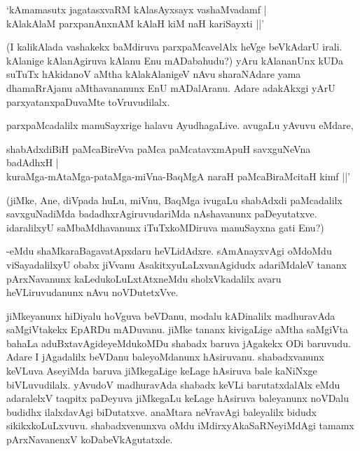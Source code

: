 \begin{shloka}
`kAmamasutx jagatasxvaRM kAlasAyxsayx vashaMvadamf |\\
kAlakAlaM parxpanAnxnAM kAlaH kiM naH kariSayxti ||'
\end{shloka}

(I kalikAlada vashakekx baMdiruva parxpaMcavelAlx heVge beVkAdarU irali. kAlanige kAlanAgiruva kAlanu Enu mADabahudu?) yAru kAlananUnx kUDa suTuTx hAkidanoV aMtha kAlakAlanigeV nAvu sharaNAdare yama dhamaRrAjanu aMthavananunx EnU mADalAranu. Adare adakAkxgi yArU parxyatanxpaDuvaMte toVruvudilalx.

parxpaMcadalilx manuSayxrige halavu AyudhagaLive. avugaLu yAvuvu eMdare,

\begin{shloka}
shabAdxdiBiH paMcaBireVva paMca paMcatavxmApuH savxguNeVna badAdhxH |\\
kuraMga-mAtaMga-pataMga-miVna-BaqMgA naraH paMcaBiraMcitaH kimf ||'
\end{shloka}

(jiMke, Ane, diVpada huLu, miVnu, BaqMga ivugaLu shabAdxdi paMcadalilx savxguNadiMda badadhxrAgiruvudariMda nAshavanunx paDeyutatxve. idaralilxyU saMbaMdhavanunx iTuTxkoMDiruva manuSayxna gati Enu?)

-eMdu shaMkaraBagavatApxdaru heVLidAdxre. sAmAnayxvAgi oMdoMdu viSayadalilxyU obabx jiVvanu AsakitxyuLaLxvanAgidudx adariMdaleV tananx pArxNavanunx kaLedukoLuLxtAtxneMdu sholxVkadalilx avaru heVLiruvudanunx nAvu noVDutetxVve.

jiMkeyanunx hiDiyalu hoVguva beVDanu, modalu kADinalilx madhuravAda saMgiVtakekx EpARDu mADuvanu. jiMke tananx kivigaLige aMtha saMgiVta bahaLa aduBxtavAgideyeMdukoMDu shabadx baruva jAgakekx ODi baruvudu. Adare I jAgadalilx beVDanu baleyoMdanunx hAsiruvanu. shabadxvanunx keVLuva AseyiMda baruva jiMkegaLige keLage hAsiruva bale kaNiNxge biVLuvudilalx. yAvudoV madhuravAda shabadx keVLi barutatxdalAlx eMdu adaralelxV taqpitx paDeyuva jiMkegaLu keLage hAsiruva baleyanunx noVDalu budidhx ilalxdavAgi biDutatxve. anaMtara neVravAgi baleyalilx bidudx sikikxkoLuLxvuvu. shabadxvenunxva oMdu iMdirxyAkaSaRNeyiMdAgi tamamx pArxNavanenxV koDabeVkAgutatxde.

